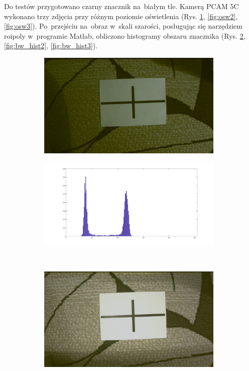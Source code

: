  Do testów przygotowano czarny znacznik na~białym tle. Kamerą PCAM 5C wykonano trzy zdjęcia przy różnym poziomie oświetlenia (Rys. \ref{fig:osw1}, \ref{fig:osw2}, \ref{fig:osw3}). Po~przejściu na~obraz w~skali szarości, posługując się narzędziem roipoly w~programie Matlab, obliczono histogramy obszaru znacznika (Rys. \ref{fig:bw_hist1}, \ref{fig:bw_hist2}, \ref{fig:bw_hist3}).\\
 \begin{figure}
 	\centering
 	\begin{subfigure}{0.4\textwidth}
 		\centering
 		\includegraphics[width=0.98\textwidth]{rgb_ciemny.jpg}
 		\caption{}
 		\label{fig:osw1}
 	\end{subfigure}%
 	\begin{subfigure}{0.55\textwidth}
 		\centering
 		\includegraphics[width=0.98\textwidth]{bw_hist1.jpg}
 		\caption{}
 		\label{fig:bw_hist1}
 	\end{subfigure}\\
 	\begin{subfigure}{0.4\textwidth}
 		\centering
 		\includegraphics[width=0.98\textwidth]{rgb_sredni.jpg}

\end{subfigure}
\end{figure}
